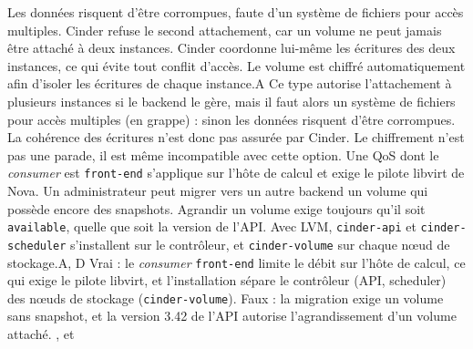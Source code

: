  {Les données risquent d'être corrompues, faute d'un système de fichiers pour accès multiples.}
  {Cinder refuse le second attachement, car un volume ne peut jamais être attaché à deux instances.}
  {Cinder coordonne lui-même les écritures des deux instances, ce qui évite tout conflit d'accès.}
  {Le volume est chiffré automatiquement afin d'isoler les écritures de chaque instance.}{A}
  {Ce type autorise l'attachement à plusieurs instances si le backend le gère, mais il faut alors un système de fichiers pour accès multiples (en grappe) : sinon les données risquent d'être corrompues. La cohérence des écritures n'est donc pas assurée par Cinder. Le chiffrement n'est pas une parade, il est même incompatible avec cette option.}
  {}
  {Une QoS dont le \emph{consumer} est \texttt{front-end} s'applique sur l'hôte de calcul et exige le pilote libvirt de Nova.}
  {Un administrateur peut migrer vers un autre backend un volume qui possède encore des snapshots.}
  {Agrandir un volume exige toujours qu'il soit \texttt{available}, quelle que soit la version de l'API.}
  {Avec LVM, \texttt{cinder-api} et \texttt{cinder-scheduler} s'installent sur le contrôleur, et \texttt{cinder-volume} sur chaque nœud de stockage.}{A, D}
  {Vrai : le \emph{consumer} \texttt{front-end} limite le débit sur l'hôte de calcul, ce qui exige le pilote libvirt, et l'installation sépare le contrôleur (API, scheduler) des nœuds de stockage (\texttt{cinder-volume}). Faux : la migration exige un volume sans snapshot, et la version 3.42 de l'API autorise l'agrandissement d'un volume attaché.}
  {,  et }

